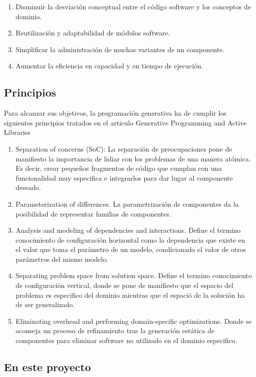 \documentclass[a4paper,11pt]{book}
\begin{document}
\begin{enumerate}
\item Disminuir la desviación conceptual entre el código software y los conceptos de dominio.
\item Reutilización y adaptabilidad de módulos software.
\item Simplificar la administración de muchas variantes de un componente.
\item Aumentar la eficiencia  en capacidad y en tiempo de ejecución.
\end{enumerate}

\subsection{Principios}

Para alcanzar sus objetivos, la programación generativa ha de cumplir los siguientes principios tratados en el articulo Generative Programming and Active Libraries\cite{gpl}

\begin{enumerate}
\item Separation of concerns (SoC): La separación de preocupaciones pone de manifiesto la importancia de lidiar con los problemas de una manera atómica. Es decir, crear pequeños fragmentos de código que cumplan con una funcionalidad muy especifica e integrarlos para dar lugar al componente deseado.
\item Parameterization of differences. La parametrización de componentes da la posibilidad de representar familias de componentes.
\item Analysis and modeling of dependencies and interactions. Define el termino conocimiento de configuración horizontal como la dependencia que existe en el valor que toma el parámetro de un modelo, condicionado el valor de otros parámetros del mismo modelo.
\item Separating problem space from solution space. Define el termino conocimiento de configuración vertical, donde se pone de manifiesto que el espacio del problema es especifico del dominio mientras que el espació de la solución ha de ser generalizado.
\item Eliminating overhead and performing domain-specific optimizations. Donde se aconseja un proceso de refinamiento tras la generación estática de componentes para eliminar software no utilizado en el dominio especifico.
\end{enumerate}

\subsection{En este proyecto}
\end{document}
